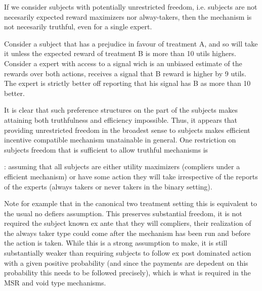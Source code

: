 If we consider subjects with potentially unrestricted freedom, i.e. subjects are not necesarily expected reward maximizers nor alway-takers, then the mechanism is not necesarily truthful, even for a single expert. 

\begin{eg}
	Consider a subject that has a prejudice in favour of treatment A, and so will take it unless the expected reward of treatment B is more than 10 utils highers. Consider a expert with access to a signal wich is an unbiased estimate of the rewards over both actions, receives a signal  that B reward is higher by 9 utils. The expert is strictly better off reporting that his signal has B as more than 10 better.
\end{eg}



It is clear that such preference structures on the part of the subjects makes attaining both truthfulness and efficiency impossible. 
Thus, it appears that providing unrestricted freedom in the broadest sense to subjects makes efficient incentive compatible mechanism unatainable in general.
One restriction on subjects freedom that is sufficient to allow truthful mechanisms is 

\begin{defn}: assuming that all subjects are either utility maximizers (compliers under a efficient mechanism) or have some action they will take irrespective of the reports of the experts (always takers or never takers in the binary setting). 
\end{defn}

Note for example that in the canonical two treatment setting this is equivalent to the usual no defiers assumption.
This preserves substantial freedom, it is not required the subject known ex ante that they will compliers, their realization of the always taker type could come after the mechanism has been run and before the action is taken. 
While this is a strong assumption to make, it is still substantially weaker than requiring subjects to follow ex post dominated action with a given positive probability (and since the payments are depedent on this probability this needs to be followed precisely), which is what is required in the MSR and void type mechanisms.


